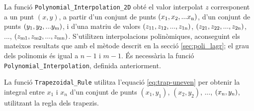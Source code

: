 


La funció \texttt{Polynomial\_Interpolation\_2D} obté el valor interpolat $z$ corresponent a un punt $(x, y)$, a partir d'un conjunt de punts $(x_\mathrm{1}, x_\mathrm{2}, ... x_\mathrm{n})$, d'un conjunt de punts $(y_\mathrm{1}, y_\mathrm{2}, ... y_\mathrm{m})$, i d'una matriu de valors $(z_\mathrm{11}, z_\mathrm{12}, ..., z_\mathrm{1n})$,
$(z_\mathrm{21}, z_\mathrm{22}, ..., z_\mathrm{2n})$, ..., $(z_\mathrm{m1}, z_\mathrm{m2}, ..., z_\mathrm{mn})$. S'utilitzen  interpolacions polinòmiques, aconseguint els mateixos resultats que amb el mètode descrit en la secció \vref{sec:poli_lagr}; el grau dels polinomis és igual a $n-1$ i $m-1$.
És necessària la funció \texttt{Polynomial\_Interpolation}, definida anteriorment.




La funció \texttt{Trapezoidal\_Rule} utilitza l'equació  \eqref{eq:trap-uneven} per obtenir la integral entre $x_1$ i $x_n$ d'un conjunt  de punts $(x_1,y_1)$, $(x_2,y_2)$, ..., $(x_\mathrm{n},y_\mathrm{n})$, utilitzant la regla dels trapezis.


